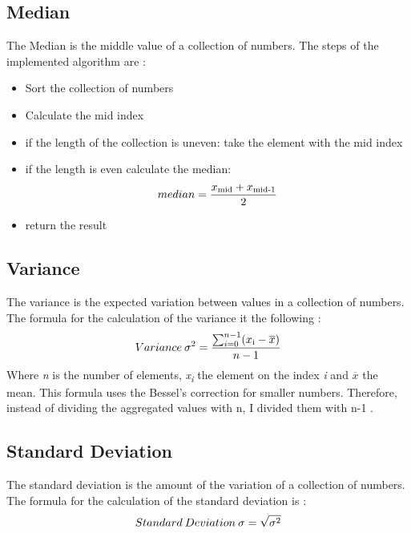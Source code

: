 \documentclass[10pt, a4paper, twocolumn]{article} %
\begin{document}
\subsection{Median}
The Median is the middle value of a collection of numbers. The steps of the implemented algorithm are
\citep{medianCFI}: 
\begin{itemize}
	\item Sort the collection of numbers 
	\item Calculate the mid index 
	\item if the length of the collection is uneven: take the element with the mid index
	\item if the length is even calculate the median: 
	\[
	median = \frac{x\textsubscript{mid} + x\textsubscript{mid-1}} {2}
	\]
	\item return the result
\end{itemize}




\subsection{Variance}
The variance is the expected variation between values in a collection of numbers. 
The formula for the calculation of the variance it the following
\citep{varianceAndStandardDeviationStack}: 
\[
Variance\:\sigma\textsuperscript{2} = \frac{\sum_{i=0}^{n-1}(x\textsubscript{i} - \overline{x})}{n-1}
\]
Where \textit{n} is the number of elements, \textit{x\textsubscript{i}} the element on the index \textit{i} and \textit{$\overline{x}$} the mean. This formula uses the Bessel's correction for smaller numbers. Therefore, instead of dividing the aggregated values with n, I divided them with n-1 \citep{varianceAndStandardDeviationStack}. 



\subsection{Standard Deviation}
The standard deviation is the amount of the variation of a collection of numbers. 
The formula for the calculation of the standard deviation is
\citep{varianceAndStandardDeviationStack}: 
\[
Standard\:Deviation\:\sigma = \sqrt{\sigma\textsuperscript{2}}
\]


\end{document}
